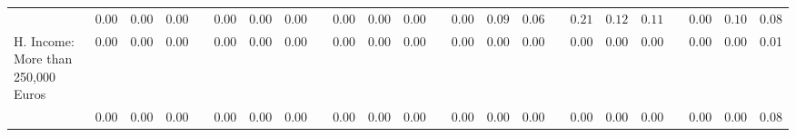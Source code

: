 \begin{center}
{\begin{longtable}{L{12em} c c c p{1.2em} c c c p{1.2em} c c c p{1.2em} c c c p{1.2em} c c c p{1.2em} c c c}
& $\mathit{     0.00}$ & $\mathit{     0.00}$ & $\mathit{     0.00}$ & & $\mathit{     0.00}$ & $\mathit{     0.00}$ & $\mathit{     0.00}$ & & $\mathit{     0.00}$ & $\mathit{     0.00}$ & $\mathit{     0.00}$ & & $\mathit{     0.00}$ & $\mathit{     0.09}$ & $\mathit{     0.06}$ & & $\mathit{     0.21}$ & $\mathit{     0.12}$ & $\mathit{     0.11}$ & & $\mathit{     0.00}$ & $\mathit{     0.10}$ & $\mathit{     0.08}$ \\[.7em]
H. Income: More than 250,000 Euros & 0.00 &      0.00 &      0.00 & &      0.00 &      0.00 &      0.00 & &      0.00 &      0.00 &      0.00 & &      0.00 &      0.00 &      0.00 & &      0.00 &      0.00 &      0.00 & &      0.00 &      0.00 &      0.01 \\*
& $\mathit{     0.00}$ & $\mathit{     0.00}$ & $\mathit{     0.00}$ & & $\mathit{     0.00}$ & $\mathit{     0.00}$ & $\mathit{     0.00}$ & & $\mathit{     0.00}$ & $\mathit{     0.00}$ & $\mathit{     0.00}$ & & $\mathit{     0.00}$ & $\mathit{     0.00}$ & $\mathit{     0.00}$ & & $\mathit{     0.00}$ & $\mathit{     0.00}$ & $\mathit{     0.00}$ & & $\mathit{     0.00}$ & $\mathit{     0.00}$ & $\mathit{     0.08}$ \\[.7em]
\hline
\end{longtable}
}
\end{center}
